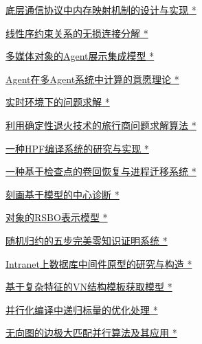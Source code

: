 \documentclass[a4paper]{article}
\begin{document}
\href{http://www.jos.org.cn/ch/reader/download_pdf.aspx?file_no=19990105&year_id=1999&quarter_id=1&falg=1}{底层通信协议中内存映射机制的设计与实现 *}

\href{http://www.jos.org.cn/ch/reader/download_pdf.aspx?file_no=19990106&year_id=1999&quarter_id=1&falg=1}{线性序约束关系的无损连接分解 *}

\href{http://www.jos.org.cn/ch/reader/download_pdf.aspx?file_no=19990107&year_id=1999&quarter_id=1&falg=1}{多媒体对象的Agent展示集成模型 *}

\href{http://www.jos.org.cn/ch/reader/download_pdf.aspx?file_no=19990108&year_id=1999&quarter_id=1&falg=1}{Agent在多Agent系统中计算的意愿理论 *}

\href{http://www.jos.org.cn/ch/reader/download_pdf.aspx?file_no=19990109&year_id=1999&quarter_id=1&falg=1}{实时环境下的问题求解 *}

\href{http://www.jos.org.cn/ch/reader/download_pdf.aspx?file_no=19990110&year_id=1999&quarter_id=1&falg=1}{利用确定性退火技术的旅行商问题求解算法 *}

\href{http://www.jos.org.cn/ch/reader/download_pdf.aspx?file_no=19990111&year_id=1999&quarter_id=1&falg=1}{一种HPF编译系统的研究与实现 *}

\href{http://www.jos.org.cn/ch/reader/download_pdf.aspx?file_no=19990112&year_id=1999&quarter_id=1&falg=1}{一种基于检查点的卷回恢复与进程迁移系统 *}

\href{http://www.jos.org.cn/ch/reader/download_pdf.aspx?file_no=19990113&year_id=1999&quarter_id=1&falg=1}{刻画基于模型的中心诊断 *}

\href{http://www.jos.org.cn/ch/reader/download_pdf.aspx?file_no=19990114&year_id=1999&quarter_id=1&falg=1}{对象的RSBO表示模型 *}

\href{http://www.jos.org.cn/ch/reader/download_pdf.aspx?file_no=19990115&year_id=1999&quarter_id=1&falg=1}{随机归约的五步完美零知识证明系统 *}

\href{http://www.jos.org.cn/ch/reader/download_pdf.aspx?file_no=19990116&year_id=1999&quarter_id=1&falg=1}{Intranet上数据库中间件原型的研究与构造 *}

\href{http://www.jos.org.cn/ch/reader/download_pdf.aspx?file_no=19990117&year_id=1999&quarter_id=1&falg=1}{基于复杂特征的VN结构模板获取模型 *}

\href{http://www.jos.org.cn/ch/reader/download_pdf.aspx?file_no=19990118&year_id=1999&quarter_id=1&falg=1}{并行化编译中递归标量的优化处理 *}

\href{http://www.jos.org.cn/ch/reader/download_pdf.aspx?file_no=19990119&year_id=1999&quarter_id=1&falg=1}{无向图的边极大匹配并行算法及其应用 *}
\end{document}
